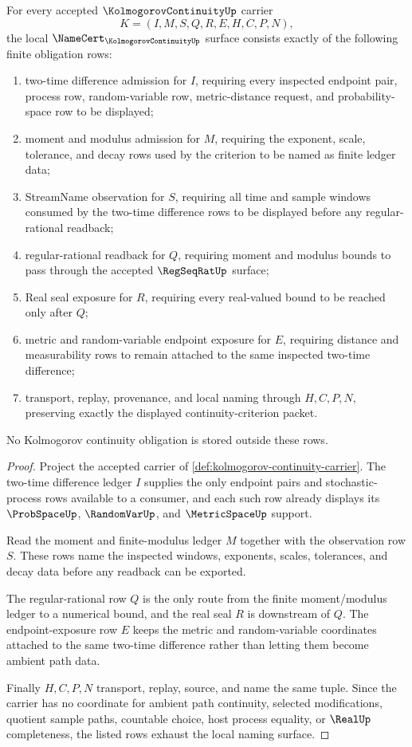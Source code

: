 \begin{theorem}
\label{thm:kolmogorov-continuity-namecert-obligations}
For every accepted $\KolmogorovContinuityUp$ carrier
$$
K=(I,M,S,Q,R,E,H,C,P,N),
$$
the local $\NameCert_{\KolmogorovContinuityUp}$ surface consists exactly of the following finite obligation rows:
\begin{enumerate}
\item two-time difference admission for $I$, requiring every inspected endpoint pair, process row, random-variable row, metric-distance request, and probability-space row to be displayed;
\item moment and modulus admission for $M$, requiring the exponent, scale, tolerance, and decay rows used by the criterion to be named as finite ledger data;
\item StreamName observation for $S$, requiring all time and sample windows consumed by the two-time difference rows to be displayed before any regular-rational readback;
\item regular-rational readback for $Q$, requiring moment and modulus bounds to pass through the accepted $\RegSeqRatUp$ surface;
\item Real seal exposure for $R$, requiring every real-valued bound to be reached only after $Q$;
\item metric and random-variable endpoint exposure for $E$, requiring distance and measurability rows to remain attached to the same inspected two-time difference;
\item transport, replay, provenance, and local naming through $H,C,P,N$, preserving exactly the displayed continuity-criterion packet.
\end{enumerate}
No Kolmogorov continuity obligation is stored outside these rows.
\end{theorem}
\begin{proof}
Project the accepted carrier of \autoref{def:kolmogorov-continuity-carrier}. The two-time difference ledger $I$ supplies the only endpoint pairs and stochastic-process rows available to a consumer, and each such row already displays its $\ProbSpaceUp$, $\RandomVarUp$, and $\MetricSpaceUp$ support.

Read the moment and finite-modulus ledger $M$ together with the observation row $S$. These rows name the inspected windows, exponents, scales, tolerances, and decay data before any readback can be exported.

The regular-rational row $Q$ is the only route from the finite moment/modulus ledger to a numerical bound, and the real seal $R$ is downstream of $Q$. The endpoint-exposure row $E$ keeps the metric and random-variable coordinates attached to the same two-time difference rather than letting them become ambient path data.

Finally $H,C,P,N$ transport, replay, source, and name the same tuple. Since the carrier has no coordinate for ambient path continuity, selected modifications, quotient sample paths, countable choice, host process equality, or $\RealUp$ completeness, the listed rows exhaust the local naming surface.
\end{proof}

